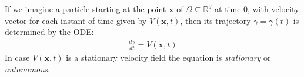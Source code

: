 If we imagine a particle starting at the point $\mathbf{x}$ of $\Omega \subseteq \mathbb{R}^{d}$ at time $0$, with velocity vector for each instant of time given by $V(\mathbf{x},t)$, then its trajectory $\gamma = \gamma(t)$ is determined by the ODE:
\begin{align*}
\frac{d\gamma}{dt} = V(\mathbf{x},t)
\end{align*}
In case $V(\mathbf{x},t)$ is a stationary velocity field the equation is \emph{stationary} or \emph{autonomous}.

